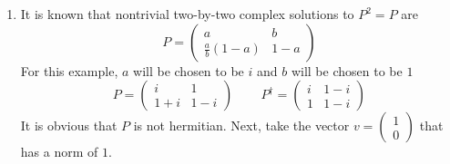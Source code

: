 \begin{sol}
\begin{enumerate}[label=\textbf{(\alph*)}]
\begin{proof}
$$0\leq 2\kappa a+a^2$$ 
$$0\leq (a+\kappa)^2-\kappa^2$$ 
Choosing $a=-\kappa$ will yield $0\leq-\kappa^2$. Since $\kappa$ is real and non-zero, $-\kappa^2$ is strictly negative. This is a contradiction, thus, the inequality cannot be satisfied if $\braket{u}{v}$ is non-zero.
\end{proof}
\begin{proof}\,\\
\textbf{Case 1:} If $P$ is hermitian\\
From Lemma 9, any $v\in V$ can be written as $u+w:u\in \text{range }P,w\in\text{null }P$. Since $P$ is a linear operator, $Pv=u$. From the definition of the orthogonal projector, $\braket{u}{w}=0$.\\
$$\bra u P\ket v=\braket{P^\dagger u}{v}$$ 
If $P$ is hermitian, $P^\dagger u=Pu=u$ 
$$\braket{u}{u}=\braket{u}{v}=\braket{u}{u}+\braket{u}{w}$$
$$\braket{u}{w}=0$$ 
\textbf{Case 2:} If $|Pv|\leq|v|\forall v\in\mathbb V$\\
Again, from Lemma 9, any $v\in \mathbb V$ can be written as $u+w:u\in \text{range }P,w\in\text{null }P$. Since $P$ is a linear operator, $Pv=u$ and $aw\in\text{null }P\forall a\in\mathbb F$. The condition for this case can be rewritten as $|u|\leq|u+w|\forall u\in \text{range }P,w\in\text{null }P$. It is trivial to conclude from the previous results and Lemma 10 that $\braket{u}{w}=0\forall u\in \text{range }P,w\in\text{null }P$.\\\\
These two cases proves the theorem.
\end{proof}
\item
It is known that nontrivial two-by-two complex solutions to $P^2=P$ are
$$P=\begin{pmatrix}
a& b\\\frac{a}{b}(1-a)&1-a
\end{pmatrix}$$ 
For this example, $a$ will be chosen to be $i$ and $b$ will be chosen to be $1$
$$P=\begin{pmatrix}i&1\\1+i&1-i\end{pmatrix}\,\,\,\,\,\,\,\,\,\,\,\,\,P^\dagger=\begin{pmatrix}i&1-i\\1&1-i\end{pmatrix}$$ 
It is obvious that $P$ is not hermitian. Next, take the vector $v=\begin{pmatrix}1\\0\end{pmatrix}$ that has a norm of $1$.

\end{enumerate}
\end{sol}
